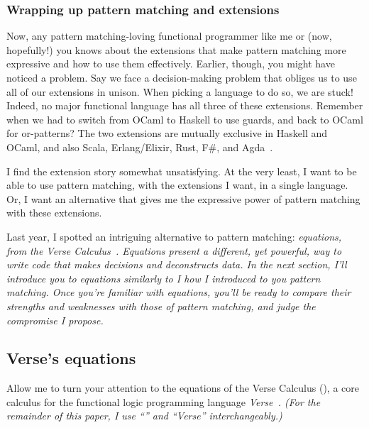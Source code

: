 \documentclass[manuscript,screen,review, 12pt, nonacm]{acmart}
\begin{document}
    \subsubsection{Wrapping up pattern matching and extensions}
    
    Now, any pattern matching-loving functional programmer like me or (now,
    hopefully!) you knows about the extensions that make pattern matching more
    expressive and how to use them effectively. Earlier, though, you might have
    noticed a problem. Say we face a decision-making problem that obliges us to
    use all of our extensions in unison. When picking a language to do so, we
    are stuck! Indeed, no major functional language has all three of these
    extensions. Remember when we had to switch from OCaml to Haskell to use
    guards, and back to OCaml for or-patterns? The two extensions are mutually
    exclusive in Haskell and OCaml, and also Scala, Erlang/Elixir, Rust, F\#,
    and Agda~\cite{haskell, ocaml, scala, erlang, elixir, rust, fsharp, agda}. 


    I find the extension story somewhat unsatisfying. At the very least, I want
    to be able to use pattern matching, with the extensions I want, in a single
    language. Or, I want an alternative that gives me the expressive power of
    pattern matching with these extensions. 

    Last year, I spotted an intriguing alternative to pattern matching:
    \it{equations}, from the Verse Calculus~\cite{verse}. Equations present a
    different, yet powerful, way to write code that makes decisions and
    deconstructs data. In the next section, I'll introduce you to equations
    similarly to I how I introduced to you pattern matching. Once you're
    familiar with equations, you'll be ready to compare their strengths and
    weaknesses with those of pattern matching, and judge the compromise I
    propose. 

\subsection{Verse's equations}
    \label{verseoverobservers}

    Allow me to turn your attention to the equations of the Verse Calculus
    (\VC), a core calculus for the functional logic programming language
    \it{Verse}~\cite{antoy2010functional, hanus2013functional, verse}. (For the
    remainder of this paper, I use “\VC” and “Verse” interchangeably.)
\end{document}
